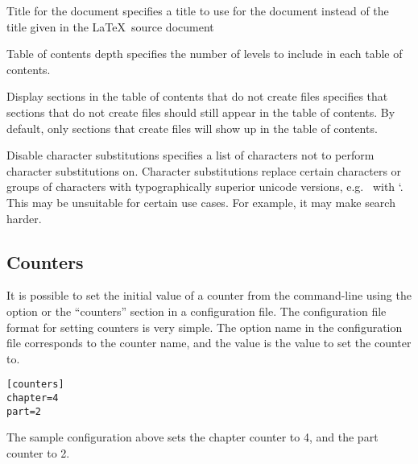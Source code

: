 \begin{configuration}{Title for the document}
specifies a title to use for the document instead of the title given
in the \LaTeX\ source document
\end{configuration}

\begin{configuration}{Table of contents depth}
specifies the number of levels to include in each table of contents.
\end{configuration}

\begin{configuration}{Display sections in the table of contents that do not create files}
specifies that sections that do not create files should still appear in the
table of contents.  By default, only sections that create files will show
up in the table of contents.
\end{configuration}

\begin{configuration}{Disable character substitutions}
specifies a list of characters not to perform character substitutions on.
Character substitutions replace certain characters or groups of characters with
typographically superior unicode versions, e.g.\  with `. This may be
unsuitable for certain use cases. For example, it may make search harder.
\end{configuration}


\subsection{Counters}

It is possible to set the initial value of a counter from the
command-line using the  option or the
``counters'' section in a configuration file.  The configuration
file format for setting counters is very simple.  The option name
in the configuration file corresponds to the counter name, and the
value is the value to set the counter to.
\begin{verbatim}
[counters]
chapter=4
part=2
\end{verbatim}

The sample configuration above sets the chapter counter to 4, and the
part counter to 2.

